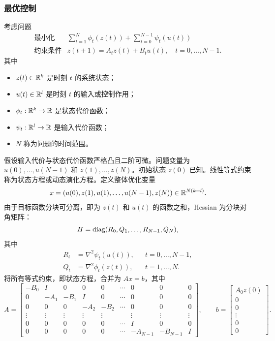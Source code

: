\subsubsection*{最优控制}
考虑问题
\[\begin{array}{ll}\text{最小化}&\displaystyle\sum_{t=1}^N\phi_t(z(t))+\sum_{t=0}^{N-1}\psi_t(u(t))\\\text{约束条件}&z(t+1)=A_tz(t)+B_tu(t),\quad t=0,\ldots,N-1.\end{array}\]
其中
\begin{itemize}
\item $z(t)\in\mathbb R^k$ 是时刻 $t$ 的系统状态；
\item $u(t)\in\mathbb R^l$ 是时刻 $t$ 的输入或控制作用；
\item $\phi_t:\mathbb R^k\to\mathbb R$ 是状态代价函数；
\item $\psi_t:\mathbb R^l\to\mathbb R$ 是输入代价函数；
\item $N$ 称为问题的时间范围。
\end{itemize}
假设输入代价与状态代价函数严格凸且二阶可微。问题变量为 $u(0),\ldots,u(N-1)$ 和 $z(1),\ldots,z(N)$。初始状态 $z(0)$ 已知。线性等式约束称为状态方程或动态演化方程。定义整体优化变量
\[x=(u(0),z(1),u(1),\ldots,u(N-1),z(N))\in\mathbb R^{N(k+l)}.\]
由于目标函数分块可分离，即为 $z(t)$ 和 $u(t)$ 的函数之和，Hessian 为分块对角矩阵：
\[H=\operatorname{diag}(R_0,Q_1,\ldots,R_{N-1},Q_N),\]
其中
\[\begin{aligned}
R_t&=\nabla^2\psi_t(u(t)),&&t=0,\ldots,N-1,\\
Q_t&=\nabla^2\phi_t(z(t)),&&t=1,\ldots,N.
\end{aligned}\]
将所有等式约束，即状态方程，合并为 $Ax=b$，其中
\begingroup\small
\[
A=\begin{bmatrix}
-B_0&I&0&0&0&\cdots&0&0&0\\
0&-A_1&-B_1&I&0&\cdots&0&0&0\\
0&0&0&-A_2&-B_2&\cdots&0&0&0\\
\vdots&\vdots&\vdots&\vdots&\vdots&&\vdots&\vdots&\vdots\\
0&0&0&0&0&\cdots&I&0&0\\
0&0&0&0&0&\cdots&-A_{N-1}&-B_{N-1}&I
\end{bmatrix},\qquad
b=\begin{bmatrix}A_0z(0)\\0\\0\\\vdots\\0\\0\end{bmatrix}.
\]
\endgroup

